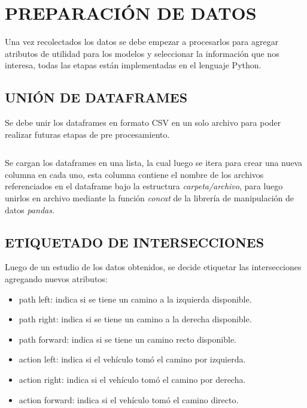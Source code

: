 
\section{PREPARACIÓN DE DATOS}
	Una vez recolectados los datos se debe empezar a procesarlos para agregar atributos de utilidad para los modelos y seleccionar la información que nos interesa, todas las etapas están implementadas en el lenguaje Python.
	
	\subsection{UNIÓN DE DATAFRAMES}
		Se debe unir los dataframes en formato CSV en un solo archivo para poder realizar futuras etapas de pre procesamiento.
		
		\inputminted[frame=lines,
		baselinestretch=1,
		fontsize=\footnotesize,
		autogobble]{python}{codigos/marco-aplicativo/df_processing.py}
		
		Se cargan los dataframes en una lista, la cual luego se itera para crear una nueva columna en cada uno, esta columna contiene el nombre de los archivos referenciados en el dataframe bajo la estructura \textit{carpeta/archivo}, para luego unirlos en archivo mediante la función \textit{concat} de la librería de manipulación de datos \textit{pandas}.
		
	\subsection{ETIQUETADO DE INTERSECCIONES}
		Luego de un estudio de los datos obtenidos, se decide etiquetar las intersecciones agregando nuevos atributos:
		
		\begin{itemize}[nosep]
			\item path left: indica si se tiene un camino a la izquierda disponible.
			\item path right: indica si se tiene un camino a la derecha disponible. 
			\item path forward: indica si se tiene un camino recto disponible.
			\item action left: indica si el vehículo tomó el camino por izquierda.
			\item action right: indica si el vehículo tomó el camino por derecha.
			\item action forward: indica si el vehículo tomó el camino directo.
		\end{itemize}
	
